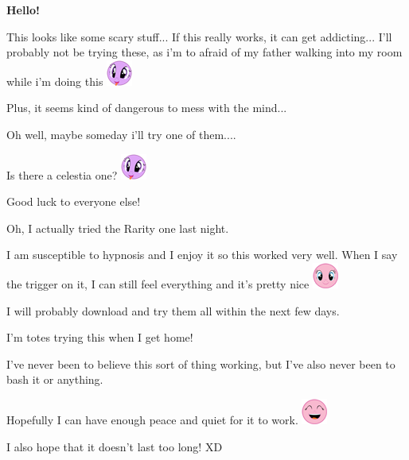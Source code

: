 \documentclass[ebook,12pt,oneside,openany]{memoir}
\begin{document}
\begin{tcolorbox}[title=Concord]
\par{\textcolor[HTML]{0000ff}{\textbf{Hello!}}}
\newline{}
\par{This looks like some scary stuff... If this really works, it can get addicting... I'll probably not be trying these, as i'm to afraid of my father walking into my room while i'm doing this \includegraphics{images/mlp_eW9KEfP.png}}
\newline{}
\par{Plus, it seems kind of dangerous to mess with the mind...}
\newline{}
\par{Oh well, maybe someday i'll try one of them.... \begin{tiny}Is there a celestia one? \includegraphics{images/mlp_eW9KEfP.png}\end{tiny}}
\par{Good luck to everyone else!}
\end{tcolorbox}
\begin{tcolorbox}[title=Chigens and Kay,colback=olive!5!white,colframe=olive!75!black,coltitle=white]
\par{Oh, I actually tried the Rarity one last night.}
\newline{}
\par{I am susceptible to hypnosis and I enjoy it so this worked very well. When I say the trigger on it, I can still feel everything and it's pretty nice \includegraphics{images/mlp_smile.png}}
\newline{}
\par{I will probably download and try them all within the next few days.}
\end{tcolorbox}
\begin{tcolorbox}[title=Miss H]
\par{I'm totes trying this when I get home! }
\par{I've never been to believe this sort of thing working, but I've also never been to bash it or anything.}
\newline{}
\par{Hopefully I can have enough peace and quiet for it to work. \includegraphics{images/mlp_laugh.png}}
\par{\begin{tiny}I also hope that it doesn't last too long! XD \end{tiny}}
\end{tcolorbox}
\end{document}

